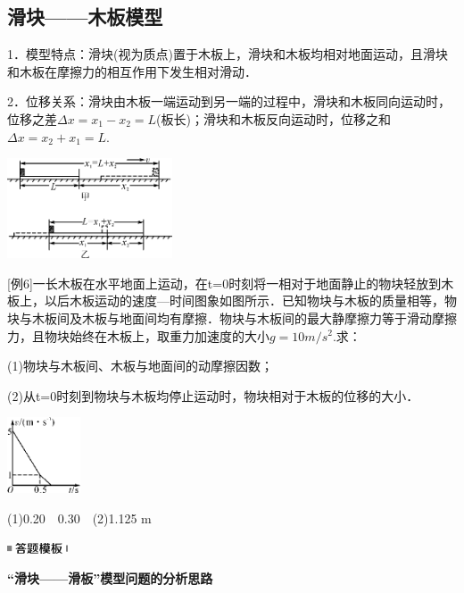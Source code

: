 \subsection{滑块------木板模型}

1．模型特点：滑块(视为质点)置于木板上，滑块和木板均相对地面运动，且滑块和木板在摩擦力的相互作用下发生相对滑动．

2．位移关系：滑块由木板一端运动到另一端的过程中，滑块和木板同向运动时，位移之差$\Delta x=x_1-x_2=L$(板长)；滑块和木板反向运动时，位移之和$\Delta x=x_2+x_1=L$.

\begin{center}\includegraphics[width=1.92708in,height=1.16667in]{media/image131.png}\end{center}

{[}例6{]}一长木板在水平地面上运动，在t=0时刻将一相对于地面静止的物块轻放到木板上，以后木板运动的速度---时间图象如图所示．已知物块与木板的质量相等，物块与木板间及木板与地面间均有摩擦．物块与木板间的最大静摩擦力等于滑动摩擦力，且物块始终在木板上，取重力加速度的大小$g=10m/s^2$.求：

(1)物块与木板间、木板与地面间的动摩擦因数；

(2)从t=0时刻到物块与木板均停止运动时，物块相对于木板的位移的大小．

\begin{center}\includegraphics[width=0.85417in,height=0.88542in]{media/image132.png}\end{center}
\begin{solution}
	(1)0.20　0.30　(2)1.125 m
\end{solution}
\begin{center}\includegraphics[width=0.70833in,height=0.125in]{media/image25.png}

\textbf{``滑块------滑板''模型问题的分析思路}
\end{center}


